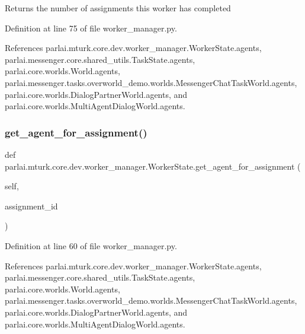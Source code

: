 \begin{DoxyVerb}Returns the number of assignments this worker has completed\end{DoxyVerb}
 

Definition at line 75 of file worker\+\_\+manager.\+py.



References parlai.\+mturk.\+core.\+dev.\+worker\+\_\+manager.\+Worker\+State.\+agents, parlai.\+messenger.\+core.\+shared\+\_\+utils.\+Task\+State.\+agents, parlai.\+core.\+worlds.\+World.\+agents, parlai.\+messenger.\+tasks.\+overworld\+\_\+demo.\+worlds.\+Messenger\+Chat\+Task\+World.\+agents, parlai.\+core.\+worlds.\+Dialog\+Partner\+World.\+agents, and parlai.\+core.\+worlds.\+Multi\+Agent\+Dialog\+World.\+agents.

\mbox{\label{classparlai_1_1mturk_1_1core_1_1dev_1_1worker__manager_1_1WorkerState_a39acee8124982d290385f35365a72051}} 
\subsubsection{\texorpdfstring{get\+\_\+agent\+\_\+for\+\_\+assignment()}{get\_agent\_for\_assignment()}}
{\footnotesize\ttfamily def parlai.\+mturk.\+core.\+dev.\+worker\+\_\+manager.\+Worker\+State.\+get\+\_\+agent\+\_\+for\+\_\+assignment (\begin{DoxyParamCaption}\item[{}]{self,  }\item[{}]{assignment\+\_\+id }\end{DoxyParamCaption})}



Definition at line 60 of file worker\+\_\+manager.\+py.



References parlai.\+mturk.\+core.\+dev.\+worker\+\_\+manager.\+Worker\+State.\+agents, parlai.\+messenger.\+core.\+shared\+\_\+utils.\+Task\+State.\+agents, parlai.\+core.\+worlds.\+World.\+agents, parlai.\+messenger.\+tasks.\+overworld\+\_\+demo.\+worlds.\+Messenger\+Chat\+Task\+World.\+agents, parlai.\+core.\+worlds.\+Dialog\+Partner\+World.\+agents, and parlai.\+core.\+worlds.\+Multi\+Agent\+Dialog\+World.\+agents.

